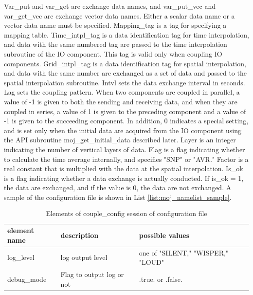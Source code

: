 \documentclass[11pt,a4paper]{report}
\newcommand{\lstref}[1]{List \ref{#1}}
\begin{document}
Var\_put and var\_get are exchange data names, and var\_put\_vec and var\_get\_vec are exchange vector data names. 
Either a scalar data name or a vector data name must be specified.
Mapping\_tag is a tag for specifying a mapping table.
Time\_intpl\_tag is a data identification tag for time interpolation, and data with the same numbered tag are passed to the time interpolation subroutine of the IO component.
This tag is valid only when coupling IO components.
Grid\_intpl\_tag is a data identification tag for spatial interpolation, and data with the same number are exchanged as a set of data and passed to the spatial interpolation subroutine.
Intvl sets the data exchange interval in seconds.
Lag sets the coupling pattern. When two components are coupled in parallel, a value of -1 is given to both the sending and receiving data, and when they are coupled in series, a value of 1 is given to the preceding component and a value of -1 is given to the succeeding component. In addition, 0 indicates a special setting, and is set only when the initial data are acquired from the IO component using the API subroutine moj\_get\_initial\_data described later.
Layer is an integer indicating the number of vertical layers of data.
Flag is a flag indicating whether to calculate the time average internally, and specifies "SNP" or "AVR."
Factor is a real constant that is multiplied with the data at the spatial interpolation.
Is\_ok is a flag indicating whether a data exchange is actually conducted.
If is\_ok = 1, the data are exchanged, and if the value is 0, the data are not exchanged.
A sample of the configuration file is shown in \lstref{list:moj_namelist_sample}.

\begin{table}[H]
\begin{center}
\caption{Elements of couple\_config session of configuration file}
{\small
\label{table:coupler_config}
\begin{tabular}{lll}
\hline\hline
 element name & description　& possible values \\
\hline
 log\_level & log output level & one of "SILENT," "WISPER," "LOUD"\\
 debug\_mode & Flag to output log or not & .true. or .false.\\
\hline\hline
\end{tabular}
}
\end{center}
\end{table}
\end{document}
